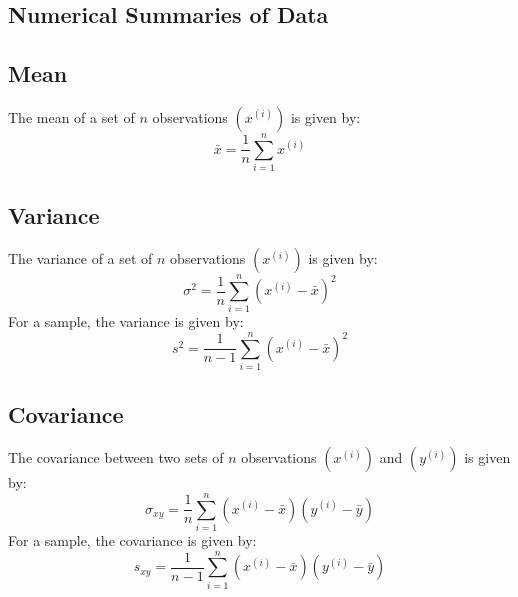 \documentclass{article}
\begin{document}
\newpage
\begin{appendix}
    \section{Numerical Summaries of Data}\label{appendix:numerical-summaries}
    \subsection{Mean}
    The mean of a set of \(n\) observations \(\left( x^{\left( i
    \right)} \right)\) is given by:
    \begin{equation*}
        \bar{x} = \frac{1}{n} \sum_{i = 1}^n x^{\left( i \right)}
    \end{equation*}
    \subsection{Variance}
    The variance of a set of \(n\) observations \(\left( x^{\left( i
    \right)} \right)\) is given by:
    \begin{equation*}
        \sigma^2 = \frac{1}{n} \sum_{i = 1}^n {\left( x^{\left( i \right)} - \bar{x} \right)}^2
    \end{equation*}
    For a sample, the variance is given by:
    \begin{equation*}
        s^2 = \frac{1}{n - 1} \sum_{i = 1}^n {\left( x^{\left( i \right)} - \bar{x} \right)}^2
    \end{equation*}
    \subsection{Covariance}
    The covariance between two sets of \(n\) observations \(\left(
    x^{\left( i \right)} \right)\) and \(\left( y^{\left( i \right)}
    \right)\) is given by:
    \begin{equation*}
        \sigma_{xy} = \frac{1}{n} \sum_{i = 1}^n \left( x^{\left( i \right)} - \bar{x} \right) \left( y^{\left( i \right)} - \bar{y} \right)
    \end{equation*}
    For a sample, the covariance is given by:
    \begin{equation*}
        s_{xy} = \frac{1}{n - 1} \sum_{i = 1}^n \left( x^{\left( i \right)} - \bar{x} \right) \left( y^{\left( i \right)} - \bar{y} \right)
    \end{equation*}
\end{appendix}
\end{document}
